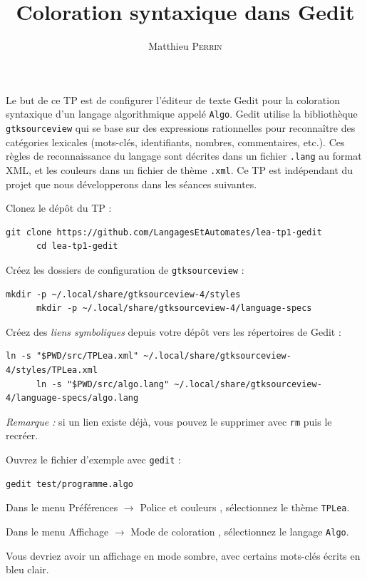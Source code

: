 \documentclass[correction]{td}
\author{Matthieu \textsc{Perrin}}
\title{Coloration syntaxique dans Gedit}
\begin{document}
\maketitle

Le but de ce TP est de configurer l'éditeur de texte Gedit pour 
la coloration syntaxique d'un langage algorithmique appelé \texttt{Algo}.
Gedit utilise la bibliothèque \texttt{gtksourceview}
qui se base sur des expressions rationnelles pour reconnaître des catégories lexicales
(mots-clés, identifiants, nombres, commentaires, etc.).
Ces règles de reconnaissance du langage sont décrites dans un fichier \texttt{.lang} au format XML,
et les couleurs dans un fichier de thème \texttt{.xml}.
Ce TP est indépendant du projet que nous développerons dans les séances suivantes.

\begin{exercice}

  \begin{question}
  \item Clonez le dépôt du TP :
    \begin{lstlisting}[gobble=6]
      git clone https://github.com/LangagesEtAutomates/lea-tp1-gedit
      cd lea-tp1-gedit
    \end{lstlisting}

  \item Créez les dossiers de configuration de \texttt{gtksourceview} :
    \begin{lstlisting}[gobble=6]
      mkdir -p ~/.local/share/gtksourceview-4/styles
      mkdir -p ~/.local/share/gtksourceview-4/language-specs
    \end{lstlisting}

  \item Créez des \emph{liens symboliques} depuis votre dépôt vers les répertoires de Gedit :
    \begin{lstlisting}[gobble=6]
      ln -s "$PWD/src/TPLea.xml" ~/.local/share/gtksourceview-4/styles/TPLea.xml
      ln -s "$PWD/src/algo.lang" ~/.local/share/gtksourceview-4/language-specs/algo.lang
    \end{lstlisting}

    \emph{Remarque :} si un lien existe déjà, vous pouvez le supprimer avec \lstinline|rm| puis le recréer.

  \item Ouvrez le fichier d'exemple avec \lstinline{gedit} :
    \begin{lstlisting}[gobble=6]
      gedit test/programme.algo
    \end{lstlisting}

  \item Dans le menu \og Préférences $\rightarrow$ Police et couleurs \fg, sélectionnez le thème \lstinline{TPLea}.

  \item Dans le menu \og Affichage $\rightarrow$ Mode de coloration \fg, sélectionnez le langage \lstinline{Algo}.
  \end{question}

  Vous devriez avoir un affichage en mode sombre, avec certains mots-clés écrits en bleu clair.
\end{exercice}
\end{document}
